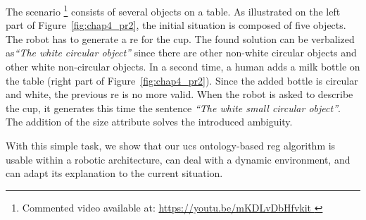 The scenario \footnote{Commented video available at: \url{https://youtu.be/mKDLvDbHfvkit }} consists of several objects on a table. As illustrated on the left part of Figure~\ref{fig:chap4_pr2}, the initial situation is composed of five objects. The robot has to generate a \acrshort{re} for the cup. The found solution can be verbalized as\textit{``The white circular object''} since there are other non-white circular objects and other white non-circular objects. In a second time, a human adds a milk bottle on the table (right part of Figure~\ref{fig:chap4_pr2}). Since the added bottle is circular and white, the previous \acrshort{re} is no more valid. When the robot is asked to describe the cup, it generates this time the sentence \textit{``The white small circular object''}. The addition of the size attribute solves the introduced ambiguity.

With this simple task, we show that our \acrshort{ucs} ontology-based \acrshort{reg} algorithm is usable within a robotic architecture, can deal with a dynamic environment, and can adapt its explanation to the current situation.